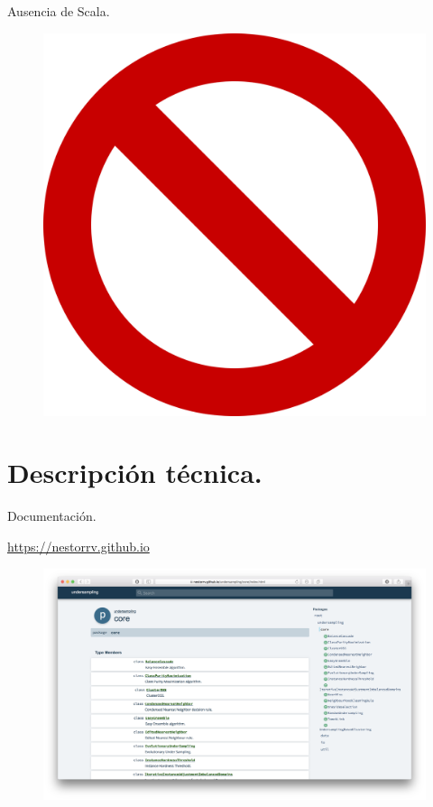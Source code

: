 \documentclass[10pt]{beamer}
\begin{document}
\begin{frame}[fragile]{Ausencia de Scala.}
	\begin{figure}[H]
	\centering
	\includegraphics[scale=0.1]{./imagenes/prohibited}
	\end{figure}
\end{frame}

\section{Descripción técnica.}

\begin{frame}[fragile]{Documentación.}
	\begin{center}
	\href{https://nestorrv.github.io}{https://nestorrv.github.io}
	\end{center}
	\vspace{-1cm}
	\begin{figure}[H]
	\centering
	\includegraphics[scale=0.11]{./imagenes/doc}
	\end{figure}
\end{frame}
\end{document}
